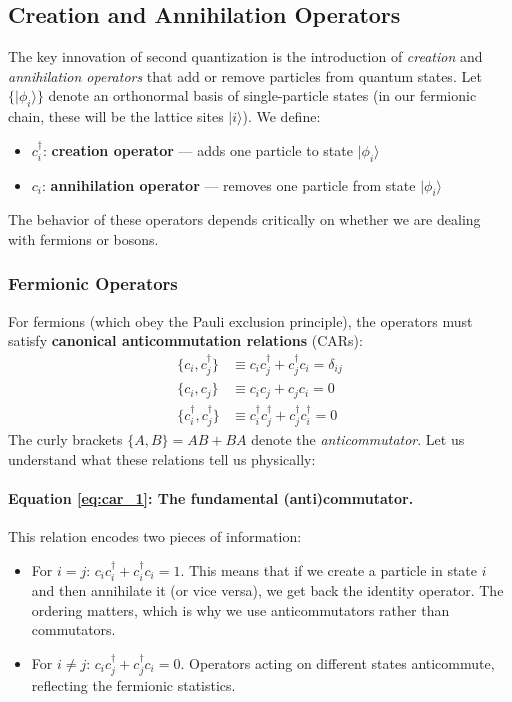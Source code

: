 \documentclass[12pt,oneside,openright]{report}
\theoremstyle{definition}
\theoremstyle{plain}
\theoremstyle{remark}
\begin{document}
\subsection{Creation and Annihilation Operators}
\label{subsec:creation_annihilation}
The key innovation of second quantization is the introduction of \emph{creation} and 
\emph{annihilation operators} that add or remove particles from quantum states. 
Let $\{|\phi_i\rangle\}$ denote an orthonormal basis of single-particle states 
(in our fermionic chain, these will be the lattice sites $|i\rangle$). We define:
\begin{itemize}
\item $c_i^\dagger$: \textbf{creation operator} — adds one particle to state $|\phi_i\rangle$
\item $c_i$: \textbf{annihilation operator} — removes one particle from state $|\phi_i\rangle$
\end{itemize}

The behavior of these operators depends critically on whether we are dealing with fermions or bosons.

\subsubsection{Fermionic Operators}
\label{subsubsec:fermionic_operators}
For fermions (which obey the Pauli exclusion principle), the operators must satisfy 
\textbf{canonical anticommutation relations} (CARs):
\begin{align}
\{c_i, c_j^\dagger\} &\equiv c_i c_j^\dagger + c_j^\dagger c_i = \delta_{ij} \label{eq:car_1}\\
\{c_i, c_j\} &\equiv c_i c_j + c_j c_i = 0 \label{eq:car_2}\\
\{c_i^\dagger, c_j^\dagger\} &\equiv c_i^\dagger c_j^\dagger + c_j^\dagger c_i^\dagger = 0 \label{eq:car_3}
\end{align}
The curly brackets $\{A,B\} = AB + BA$ denote the \emph{anticommutator}. Let us understand 
what these relations tell us physically:

\paragraph{Equation \eqref{eq:car_1}: The fundamental (anti)commutator.}
This relation encodes two pieces of information:
\begin{itemize}
\item For $i=j$: $c_i c_i^\dagger + c_i^\dagger c_i = 1$. This means that if we create a particle 
in state $i$ and then annihilate it (or vice versa), we get back the identity operator. The ordering 
matters, which is why we use anticommutators rather than commutators.
\item For $i\neq j$: $c_i c_j^\dagger + c_j^\dagger c_i = 0$. Operators acting on different states 
anticommute, reflecting the fermionic statistics.
\end{itemize}
\end{document}
